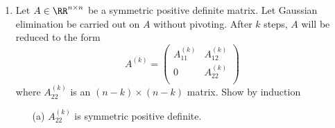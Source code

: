 \documentclass[11pt]{article}
\begin{document}
\begin{enumerate}
    \item %
        Let $A \in \RR^{n \times n}$ be a symmetric positive definite matrix.
        Let Gaussian elimination be carried out on $A$ without pivoting.
        After $k$ steps, $A$ will be reduced to the form
        \[
            A^{(k)} =
            \begin{pmatrix}
                A_{11}^{(k)} & A_{12}^{(k)} \\
                0            & A_{22}^{(k)} \\
            \end{pmatrix}
        \]
        where $A_{22}^{(k)}$ is an $(n - k) \times (n - k)$ matrix.
        Show by induction
        \begin{enumerate}
            \item[(a)]
                $A_{22}^{(k)}$ is symmetric positive definite.


\end{enumerate}
\end{enumerate}
\end{document}
